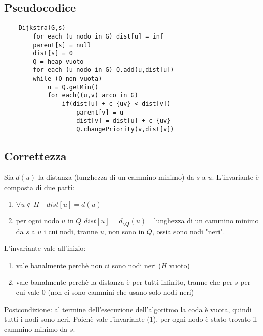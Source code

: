 \documentclass[12pt]{article}
\begin{document}
\subsection{Pseudocodice}
\begin{verbatim}
    Dijkstra(G,s)
        for each (u nodo in G) dist[u] = inf
        parent[s] = null
        dist[s] = 0
        Q = heap vuoto
        for each (u nodo in G) Q.add(u,dist[u])
        while (Q non vuota)
            u = Q.getMin()
            for each((u,v) arco in G)
                if(dist[u] + c_{uv} < dist[v])
                    parent[v] = u
                    dist[v] = dist[u] + c_{uv}
                    Q.changePriority(v,dist[v])
\end{verbatim}
\subsection{Correttezza}
Sia $d(u)$ la distanza (lunghezza di un cammino minimo) da $s$ a $u$. L'invariante è composta di due parti:
\begin{enumerate}
    \item $\forall u\notin H \quad dist[u]=d(u)$
    \item per ogni nodo $u$ in $Q$ $dist[u]=d_{\backslash Q}(u)$= lunghezza di un cammino minimo da $s$ a $u$ i cui nodi, tranne $u$, non sono in $Q$, ossia sono nodi "neri".
\end{enumerate}
L'invariante vale all'inizio:
\begin{enumerate}
    \item vale banalmente perchè non ci sono nodi neri ($H$ vuoto)
    \item vale banalmente perchè la distanza è per tutti infinito, tranne che per $s$ per cui vale 0 (non ci sono cammini che usano solo nodi neri) 
\end{enumerate}
Postcondizione: al termine dell'esecuzione dell'algoritmo la coda è vuota, quindi tutti i nodi sono neri. Poichè vale l'invariante (1), per ogni nodo è stato trovato il cammino minimo da $s$.
\end{document}
